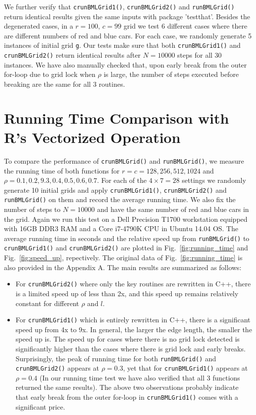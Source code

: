 \documentclass{article}
\begin{document}
We further verify that \texttt{crunBMLGrid1()}, \texttt{crunBMLGrid2()} and
\texttt{runBMLGrid()} return identical results given the same inputs with
package 'testthat'. Besides the degenerated cases, in a $r=100$, $c=99$
grid we test 6 different cases where there are different numbers of red and blue
cars. For each case, we randomly generate 5 instances of initial grid
\texttt{g}. Our tests make sure that both \texttt{crunBMLGrid1()} and
\texttt{crunBMLGrid2()} return identical results after $N = 10000$ steps for all
30 instances. We have also manually checked that, upon early break from the
outer for-loop due to grid lock when $\rho$ is large, the number of steps executed
before breaking are the same for all 3 routines.

\section{Running Time Comparison with R's Vectorized Operation}
To compare the performance of \texttt{crunBMLGrid()} and \texttt{runBMLGrid()},
we measure the running time of both functions for $r=c=128,256,512,1024$ and
$\rho=0.1,0.2,9.3,0.4,0.5,0.6,0.7$. For each of the $4\times7=28$ settings we
randomly generate 10 initial grids and apply \texttt{crunBMLGrid1()},
\texttt{crunBMLGrid2()} and \texttt{runBMLGrid()} on them and record the average
running time. We also fix the number of steps to $N=10000$ and have the same
number of red and blue cars in the grid. Again we run this test on a Dell
Precision T1700 workstation equipped with 16GB DDR3 RAM and a Core i7-4790K CPU
in Ubuntu 14.04 OS. The average running time in seconds and the relative speed up from
\texttt{runBMLGrid()} to \texttt{crunBMLGrid1()} and \texttt{crunBMLGrid2()} are
plotted in Fig.~\ref{fig:running_time} and Fig.~\ref{fig:speed_up}, repectively.
The original data of Fig.~\ref{fig:running_time} is also provided in the
Appendix A. The main results are summarized as follows:
\begin{itemize}
    \item For \texttt{crunBMLGrid2()} where only the key routines are rewritten
    in C++, there is a limited speed up of less than 2x, and this speed up
    remains relatively constant for different $\rho$ and $l$.
    \item For \texttt{crunBMLGrid1()} which is entirely rewritten in C++, there
    is a significant speed up from 4x to 9x. In general, the larger the edge
    length, the smaller the speed up is. The speed up for cases where there is
    no grid lock detected is significantly higher than the cases where there is
    grid lock and early breaks. Surprisingly, the peak of running time for both
    \texttt{runBMLGrid()} and \texttt{crunBMLGrid2()} appears at $\rho = 0.3$,
    yet that for \texttt{crunBMLGrid1()} appears at $\rho = 0.4$ (In our
    running time test we have also verified that all 3 functions returned the
    same results). The above two observations probably indicate that early break
    from the outer for-loop in \texttt{crunBMLGrid1()} comes with a significant
    price.
\end{itemize}
\end{document}

